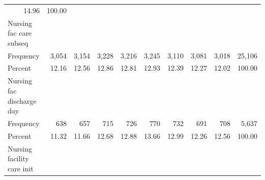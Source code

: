 \documentclass{article}
\begin{document}
\begin{table}[!h]
\begin{tabular}{llllllllll}
  \multicolumn{1}{r}{14.96} &
  \multicolumn{1}{r}{100.00} \\
\multicolumn{1}{l}{\hspace{1em}Nursing fac care subseq} &
  \multicolumn{1}{|r}{} &
  \multicolumn{1}{r}{} &
  \multicolumn{1}{r}{} &
  \multicolumn{1}{r}{} &
  \multicolumn{1}{r}{} &
  \multicolumn{1}{r}{} &
  \multicolumn{1}{r}{} &
  \multicolumn{1}{r}{} &
  \multicolumn{1}{r}{} \\
\multicolumn{1}{l}{\hspace{2em}Frequency} &
  \multicolumn{1}{|r}{3,054} &
  \multicolumn{1}{r}{3,154} &
  \multicolumn{1}{r}{3,228} &
  \multicolumn{1}{r}{3,216} &
  \multicolumn{1}{r}{3,245} &
  \multicolumn{1}{r}{3,110} &
  \multicolumn{1}{r}{3,081} &
  \multicolumn{1}{r}{3,018} &
  \multicolumn{1}{r}{25,106} \\
\multicolumn{1}{l}{\hspace{2em}Percent} &
  \multicolumn{1}{|r}{12.16} &
  \multicolumn{1}{r}{12.56} &
  \multicolumn{1}{r}{12.86} &
  \multicolumn{1}{r}{12.81} &
  \multicolumn{1}{r}{12.93} &
  \multicolumn{1}{r}{12.39} &
  \multicolumn{1}{r}{12.27} &
  \multicolumn{1}{r}{12.02} &
  \multicolumn{1}{r}{100.00} \\
\multicolumn{1}{l}{\hspace{1em}Nursing fac discharge day} &
  \multicolumn{1}{|r}{} &
  \multicolumn{1}{r}{} &
  \multicolumn{1}{r}{} &
  \multicolumn{1}{r}{} &
  \multicolumn{1}{r}{} &
  \multicolumn{1}{r}{} &
  \multicolumn{1}{r}{} &
  \multicolumn{1}{r}{} &
  \multicolumn{1}{r}{} \\
\multicolumn{1}{l}{\hspace{2em}Frequency} &
  \multicolumn{1}{|r}{638} &
  \multicolumn{1}{r}{657} &
  \multicolumn{1}{r}{715} &
  \multicolumn{1}{r}{726} &
  \multicolumn{1}{r}{770} &
  \multicolumn{1}{r}{732} &
  \multicolumn{1}{r}{691} &
  \multicolumn{1}{r}{708} &
  \multicolumn{1}{r}{5,637} \\
\multicolumn{1}{l}{\hspace{2em}Percent} &
  \multicolumn{1}{|r}{11.32} &
  \multicolumn{1}{r}{11.66} &
  \multicolumn{1}{r}{12.68} &
  \multicolumn{1}{r}{12.88} &
  \multicolumn{1}{r}{13.66} &
  \multicolumn{1}{r}{12.99} &
  \multicolumn{1}{r}{12.26} &
  \multicolumn{1}{r}{12.56} &
  \multicolumn{1}{r}{100.00} \\
\multicolumn{1}{l}{\hspace{1em}Nursing facility care init} &
  \multicolumn{1}{|r}{} &
  \multicolumn{1}{r}{} &
  \multicolumn{1}{r}{} &
  \multicolumn{1}{r}{} &

\end{tabular}
\end{table}
\end{document}
